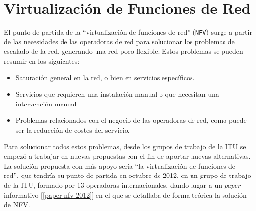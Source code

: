 \documentclass[a4paper, oneside, 12pt]{book}
\begin{document}
	
	\pagebreak
	
	\chapter{Virtualización de Funciones de Red}
	\label{sec: nfv}
	
	\noindent El punto de partida de la ``virtualización de funciones de red'' (\texttt{NFV}) surge a partir de las necesidades de las operadoras de red para solucionar los problemas de escalado de la red, generando una red poco flexible. Estos problemas se pueden resumir en los siguientes:
	\begin{itemize}
		\item Saturación general en la red, o bien en servicios específicos.
		\item Servicios que requieren una instalación manual o que necesitan una intervención manual.
		\item Problemas relacionados con el negocio de las operadoras de red, como puede ser la reducción de costes del servicio.
	\end{itemize}
	
	\noindent Para solucionar todos estos problemas, desde los grupos de trabajo de la ITU se empezó a trabajar en nuevas propuestas con el fin de aportar nuevas alternativas. La solución propuesta con más apoyo sería ``la virtualización de funciones de red'', que tendría su punto de partida en octubre de 2012, en un grupo de trabajo de la ITU, formado por 13 operadoras internacionales, dando lugar a un \textit{paper} informativo [\ref{paper nfv 2012}] en el que se detallaba de forma teórica la solución de NFV. \\
	
\end{document}
